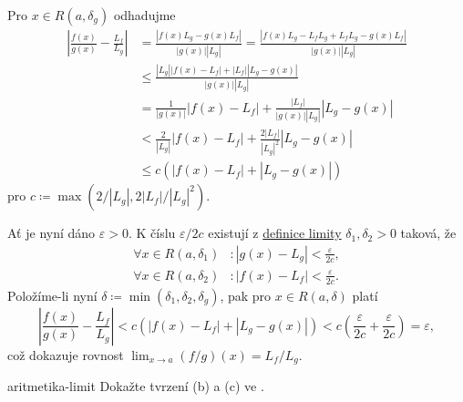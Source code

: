 \begin{thmproof}
 Pro $x \in R(a,\delta_g)$ odhadujme
 \begin{align*}
  \left| \frac{f(x)}{g(x)} - \frac{L_f}{L_g} \right| &= \frac{|f(x)L_g -
  g(x)L_f|}{|g(x)||L_g|} = \frac{|f(x) L_g - L_f L_g + L_f L_g -
  g(x)L_f|}{|g(x)| |L_g|}\\
  																									 & \leq \frac{|L_g| |f(x) -
  																									 L_f| + |L_f| |L_g -
  																									g(x)|}{|g(x)| |L_g|}\\
  																									 &= \frac{1}{|g(x)|}
  																									 |f(x) - L_f| +
  																									 \frac{|L_f|}{|g(x)|
  																									 |L_g|}|L_g - g(x)|\\
  																									 &< \frac{2}{|L_g|}|f(x) -
  																									 L_f| + \frac{2
  																									 |L_f|}{|L_g|^2}|L_g -
  																									 g(x)|\\
  																									 & \leq c(|f(x) - L_f| +
  																									 |L_g - g(x)|)
 \end{align*}
 pro $c \coloneqq \max(2 / |L_g|, 2|L_f|/|L_g|^2)$.

 Ať je nyní dáno $\varepsilon>0$. K číslu $\varepsilon / 2c$ existují z
 \hyperref[def:oboustranna-limita-funkce]{definice limity} $\delta_1,\delta_2>0$
 taková, že
 \begin{align*}
 	\forall x \in R(a,\delta_1)&: |g(x) - L_g| < \frac{\varepsilon}{2c},\\
 	\forall x \in R(a,\delta_2)&: |f(x) - L_f| < \frac{\varepsilon}{2c}.
 \end{align*}
 Položíme-li nyní $\delta \coloneqq \min(\delta_1,\delta_2,\delta_g)$, pak pro
 $x \in R(a,\delta)$ platí
 \[
  \left| \frac{f(x)}{g(x)} - \frac{L_f}{L_g} \right| < c (|f(x) - L_f| + |L_g -
  g(x)|) < c \left(\frac{\varepsilon}{2c} + \frac{\varepsilon}{2c}\right) =
  \varepsilon,
 \]
 což dokazuje rovnost $\lim_{x \to a} (f / g)(x) = L_f / L_g$.
\end{thmproof}

\begin{exercise}{}{aritmetika-limit}
 Dokažte tvrzení (b) a (c) ve .
\end{exercise}
